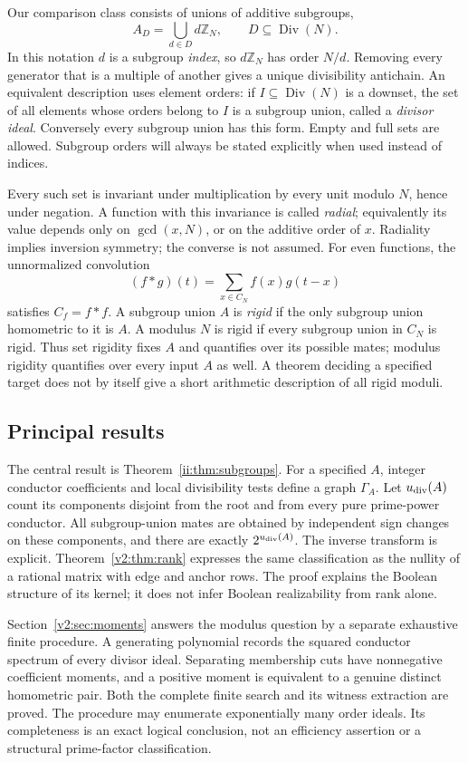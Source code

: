 \documentclass[11pt]{article}
\numberwithin{equation}{section}
\theoremstyle{definition}
\theoremstyle{remark}
\newcommand{\Z}{\mathbb Z}
\DeclareMathOperator{\Div}{Div}
\begin{document}
Our comparison class consists of unions of additive subgroups,
\begin{equation}\label{v2:eq:AD}
 A_D=\bigcup_{d\in D}d\Z_N,\qquad D\subseteq\Div(N).
\end{equation}
In this notation $d$ is a subgroup \emph{index}, so $d\Z_N$ has order $N/d$. Removing every generator that is a multiple of another gives a unique divisibility antichain. An equivalent description uses element orders: if $I\subseteq\Div(N)$ is a downset, the set of all elements whose orders belong to $I$ is a subgroup union, called a \emph{divisor ideal}. Conversely every subgroup union has this form. Empty and full sets are allowed. Subgroup orders will always be stated explicitly when used instead of indices.

Every such set is invariant under multiplication by every unit modulo $N$, hence under negation. A function with this invariance is called \emph{radial}; equivalently its value depends only on $\gcd(x,N)$, or on the additive order of $x$. Radiality implies inversion symmetry; the converse is not assumed. For even functions, the unnormalized convolution
\[
 (f*g)(t)=\sum_{x\in C_N}f(x)g(t-x)
\]
satisfies $C_f=f*f$. A subgroup union $A$ is \emph{rigid} if the only subgroup union homometric to it is $A$. A modulus $N$ is rigid if every subgroup union in $C_N$ is rigid. Thus set rigidity fixes $A$ and quantifies over its possible mates; modulus rigidity quantifies over every input $A$ as well. A theorem deciding a specified target does not by itself give a short arithmetic description of all rigid moduli.

\subsection{Principal results}
The central result is Theorem~\ref{ii:thm:subgroups}. For a specified $A$, integer conductor coefficients and local divisibility tests define a graph $\Gamma_A$. Let $u_{\rm div}(A)$ count its components disjoint from the root and from every pure prime-power conductor. All subgroup-union mates are obtained by independent sign changes on these components, and there are exactly $2^{u_{\rm div}(A)}$. The inverse transform is explicit. Theorem~\ref{v2:thm:rank} expresses the same classification as the nullity of a rational matrix with edge and anchor rows. The proof explains the Boolean structure of its kernel; it does not infer Boolean realizability from rank alone.

Section~\ref{v2:sec:moments} answers the modulus question by a separate exhaustive finite procedure. A generating polynomial records the squared conductor spectrum of every divisor ideal. Separating membership cuts have nonnegative coefficient moments, and a positive moment is equivalent to a genuine distinct homometric pair. Both the complete finite search and its witness extraction are proved. The procedure may enumerate exponentially many order ideals. Its completeness is an exact logical conclusion, not an efficiency assertion or a structural prime-factor classification.
\end{document}
